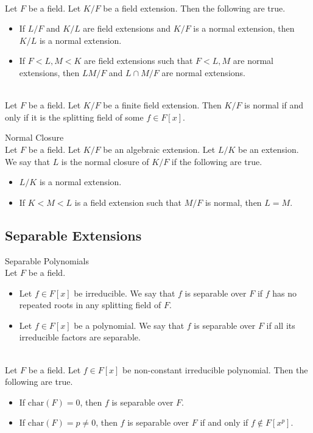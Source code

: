 \documentclass[a4paper]{article}
\begin{document}
\begin{prp}{}{}\\
Let $F$ be a field. Let $K/F$ be a field extension. Then the following are true. 
\begin{itemize}
\item If $L/F$ and $K/L$ are field extensions and $K/F$ is a normal extension, then $K/L$ is a normal extension. 
\item If $F<L,M<K$ are field extensions such that $F<L,M$ are normal extensions, then $LM/F$ and $L\cap M/F$ are normal extensions. 
\end{itemize}
\end{prp}

\begin{prp}{}{}\\
Let $F$ be a field. Let $K/F$ be a finite field extension. Then $K/F$ is normal if and only if it is the splitting field of some $f\in F[x]$. 
\end{prp}

\begin{defn}{Normal Closure}{}\\
Let $F$ be a field. Let $K/F$ be an algebraic extension. Let $L/K$ be an extension. We say that $L$ is the normal closure of $K/F$ if the following are true. 
\begin{itemize}
\item $L/K$ is a normal extension. 
\item If $K<M<L$ is a field extension such that $M/F$ is normal, then $L=M$. 
\end{itemize}
\end{defn}

\subsection{Separable Extensions}
\begin{defn}{Separable Polynomials}{}\\
Let $F$ be a field. 
\begin{itemize}
\item Let $f\in F[x]$ be irreducible. We say that $f$ is separable over $F$ if $f$ has no repeated roots in any splitting field of $F$. 
\item Let $f\in F[x]$ be a polynomial. We say that $f$ is separable over $F$ if all its irreducible factors are separable. 
\end{itemize}
\end{defn}

\begin{prp}{}{}\\
Let $F$ be a field. Let $f\in F[x]$ be non-constant irreducible polynomial. Then the following are true. 
\begin{itemize}
\item If $\text{char}(F)=0$, then $f$ is separable over $F$. 
\item If $\text{char}(F)=p\neq 0$, then $f$ is separable over $F$ if and only if $f\notin F[x^p]$. 
\end{itemize}
\end{prp}
\end{document}
